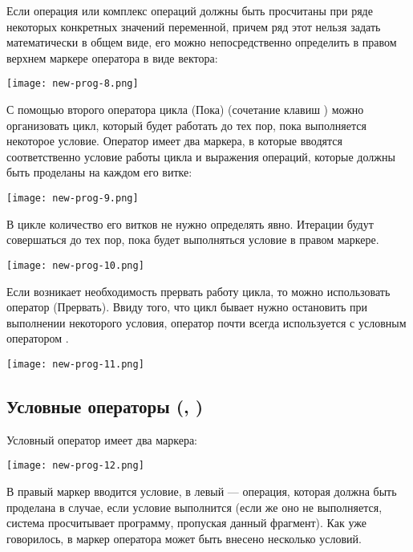 Если операция или комплекс операций должны быть просчитаны при ряде некоторых конкретных значений переменной, причем ряд этот нельзя задать математически в общем виде, его можно непосредственно определить в правом верхнем маркере оператора  в виде вектора:
\begin{center}
	\texttt{[image: new-prog-8.png]}
\end{center}

С помощью второго оператора цикла  (Пока) (сочетание клавиш \keys{\ctrl+]} ) можно организовать цикл, который будет работать до тех пор, пока выполняется некоторое условие. Оператор  имеет два маркера, в которые вводятся соответственно условие работы цикла и выражения операций, которые должны быть проделаны на каждом его витке:
\begin{center}
	\texttt{[image: new-prog-9.png]}
\end{center}


В цикле  количество его витков не нужно определять явно. Итерации будут совершаться до тех пор, пока будет выполняться условие в правом маркере.

\begin{center}
	\texttt{[image: new-prog-10.png]}
\end{center}

Если возникает необходимость прервать работу цикла, то можно использовать оператор  (Прервать). Ввиду того, что цикл бывает нужно остановить при выполнении некоторого условия, оператор  почти всегда используется с условным оператором .

\begin{center}
	\texttt{[image: new-prog-11.png]}
\end{center}


\subsection*{Условные операторы (, )}
Условный оператор  имеет два маркера:
\begin{center}
	\texttt{[image: new-prog-12.png]}
\end{center}
В правый маркер вводится условие, в левый --- операция, которая должна быть проделана в случае, если условие выполнится (если же оно не выполняется, система просчитывает программу, пропуская данный фрагмент). Как уже говорилось, в маркер оператора может быть внесено несколько условий.

